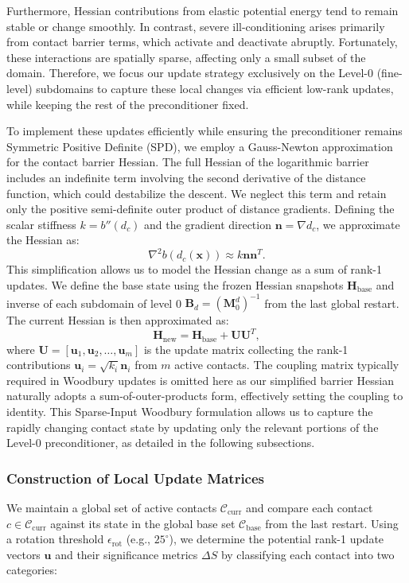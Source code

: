 \documentclass[acmtog,anonymous,review,screen,nonacm]{acmart}
\begin{document}
Furthermore, Hessian contributions from elastic potential energy tend to remain stable or change smoothly. In contrast, severe ill-conditioning arises primarily from contact barrier terms, which activate and deactivate abruptly. Fortunately, these interactions are spatially sparse, affecting only a small subset of the domain. Therefore, we focus our update strategy exclusively on the Level-0 (fine-level) subdomains to capture these local changes via efficient low-rank updates, while keeping the rest of the preconditioner fixed.

To implement these updates efficiently while ensuring the preconditioner remains Symmetric Positive Definite (SPD), we employ a Gauss-Newton approximation for the contact barrier Hessian. The full Hessian of the logarithmic barrier includes an indefinite term involving the second derivative of the distance function, which could destabilize the descent. We neglect this term and retain only the positive semi-definite outer product of distance gradients. Defining the scalar stiffness $k = b''(d_c)$ and the gradient direction $\mathbf{n} = \nabla d_c$, we approximate the Hessian as:
\begin{equation}
    \nabla^2 b(d_c(\mathbf{x})) \approx k \mathbf{n} \mathbf{n}^T.
\end{equation}
This simplification allows us to model the Hessian change as a sum of rank-1 updates. 
We define the base state using the frozen Hessian snapshots $\mathbf{H}_{\text{base}}$ 
and inverse of each subdomain of level 0 $\mathbf{B}_d = (\mathbf{M}_{0}^d)^{-1}$ from the last global restart. The current Hessian is then approximated as:
\begin{equation}\label{eq: Hessian}
    \mathbf{H}_{\text{new}} = \mathbf{H}_{\text{base}} + \mathbf{U} \mathbf{U}^T,
\end{equation}
where $\mathbf{U} = [\mathbf{u}_1, \mathbf{u}_2, \dots, \mathbf{u}_m]$ is the update matrix collecting the rank-1 contributions $\mathbf{u}_i = \sqrt{k_i} \mathbf{n}_i$ from $m$ active contacts. The coupling matrix typically required in Woodbury updates is omitted here as our simplified barrier Hessian naturally adopts a sum-of-outer-products form, effectively setting the coupling to identity. 
This Sparse-Input Woodbury formulation allows us to capture the rapidly changing contact state by updating only the relevant portions of the Level-0 preconditioner, as detailed in the following subsections.

\subsubsection{Construction of Local Update Matrices}
We maintain a global set of active contacts $\mathcal{C}_{\text{curr}}$ and compare each contact $c \in \mathcal{C}_{\text{curr}}$ against its state in the global base set $\mathcal{C}_{\text{base}}$ from the last restart. Using a rotation threshold $\epsilon_{\text{rot}}$ (e.g., $25^\circ$), we determine the potential rank-1 update vectors $\mathbf{u}$ and their significance metrics $\Delta S$ by classifying each contact into two categories:
\end{document}
